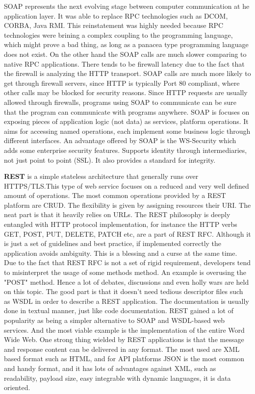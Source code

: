 SOAP represents the next evolving stage between computer communication at he application layer. It was able to replace RPC technologies such as DCOM, CORBA, Java RMI. This reinstatement was highly needed because RPC technologies were brining a complex coupling to the programming language, which might prove a bad thing, as long as a panacea type programming language does not exist. On the other hand the SOAP calls are much slower comparing to native RPC applications. There tends to be firewall latency due to the fact that the firewall is analyzing the HTTP transport. SOAP calls are much more likely to get through firewall servers, since HTTP is typically Port 80 compliant, where other calls may be blocked for security reasons. Since HTTP requests are usually allowed through firewalls, programs using SOAP to communicate can be sure that the program can communicate with programs anywhere. SOAP is focuses on exposing pieces of application logic (not data) as services, platform operations. It aims for accessing named operations, each implement some business logic through different interfaces. An advantage offered by SOAP is the WS-Security which adds some enterprise security features. Supports identity through intermediaries, not just point to point (SSL). It also provides a standard for integrity.

\textbf{REST} is a simple stateless architecture that generally runs over HTTPS/TLS.This type of web service focuses on a reduced and very well defined amount of operations. The most common operations provided by a REST platform are CRUD. The flexibility is given by assigning resources their URI. The neat part is that it heavily relies on URLs. The REST philosophy is deeply entangled with HTTP protocol implementation, for instance the HTTP verbs GET, POST, PUT, DELETE, PATCH etc, are a part of REST RFC. Although it is just a set of guidelines and best practice, if implemented correctly the application avoids ambiguity. This is a blessing and a curse at the same time. Due to the fact that REST RFC is not a set of rigid requirement, developers tend to misinterpret the usage of some methods method. An example is overusing the "POST" method. Hence a lot of debates, discussions and even holly wars are held on this topic. The good part is that it doesn't need tedious descriptor files such as WSDL in order to describe a REST application. The documentation is usually done in textual manner, just like code documentation. REST gained a lot of popularity as being a simpler alternative to SOAP and WSDL-based web services. And the most viable example is the implementation of the entire Word Wide Web. One strong thing wielded by REST applications is that the message and response content can be delivered in any format. The most used are XML based format such as HTML, and for API platforms JSON is the most common and handy format, and it has lots of advantages against XML, such as readability, payload size, easy integrable with dynamic languages, it is data oriented.

